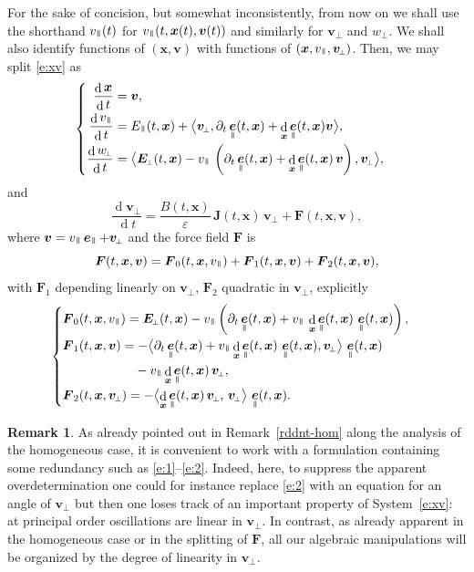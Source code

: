 \documentclass[10pt]{amsart}
\newenvironment{splitcases}
{\begin{cases}\begin{aligned}}
{\end{aligned}\end{cases}}
\newcommand{\sperp}{{\scriptscriptstyle\perp}}
\newcommand{\blangle}{\bigl\langle}
\newcommand{\brangle}{\bigr\rangle}
\let\eps\varepsilon
\let\d\partial
\DeclareMathOperator\dD{d}\let\dd\dD
\theoremstyle{plain}
\theoremstyle{definition}
\newtheorem{remark}[theorem]{Remark}
\newcommand\br{\begin{remark}}
\newcommand\er{\end{remark}}
\newcommand{\be}{\begin{equation}}
\newcommand{\ee}{\end{equation}}
\newcommand\bE{{\boldsymbol E}}
\newcommand\bF{{\boldsymbol F}}
\newcommand\bJ{{\boldsymbol J}}
\newcommand\bfv{{\boldsymbol v}}
\newcommand\bfx{{\boldsymbol x}}
\DeclareMathOperator{\beD}{\boldsymbol{e}}
\newcommand\eDpar{\beD_\mypar}
\newcommand\vpar{v_\mypar}
\newcommand\bvperp{\bfv_{\!\sperp}}
\newcommand\eperp{w_{\!\sperp}}
\newcommand\Epar{E_\mypar}
\newcommand\Eperp{\bE_{\!\sperp}}
\newcommand{\mypar}{{\mkern3mu\vphantom{\perp}\vrule depth 0pt\mkern2mu\vrule depth 0pt\mkern3mu}}
\begin{document}
For the sake of concision, but somewhat inconsistently, from now on we shall use the shorthand $\vpar(t)$ for $\vpar(t,\bfx(t),\bfv(t))$ and similarly for $\bvperp$ and $\eperp$. We shall also identify functions of $(\bfx,\bfv)$ with functions of $(\bfx,\vpar,\bvperp)$. Then, we may split \eqref{e:xv} as
\be
\label{e:1}
\begin{splitcases}
\frac{\dD\bfx}{\dD t} &=\bfv,
\\
\frac{\dD\vpar}{\dD t}&=\Epar(t,\bfx)+\blangle \bvperp ,
\d_t\eDpar(t,\bfx)+\dD_{\bfx}\eDpar(t,\bfx)\bfv \brangle,
\\
\frac{\dD\eperp}{\dD t}&= \blangle \Eperp(t,\bfx)-\vpar\,\left(\d_t\eDpar(t,\bfx)+\dD_{\bfx}\eDpar(t,\bfx)\,\bfv\right), \bvperp\brangle,
\end{splitcases}
\ee
and
\be
\label{e:2}
\frac{\dD\bvperp}{\dD t}=
\frac{B(t,\bfx)}{\eps}\, \bJ(t,\bfx)\,\bvperp
+ \bF(t,\bfx,\bfv),
\ee
where $\bfv=\vpar\eDpar+\bvperp$ and the force field $\bF$ is
\[
\bF(t,\bfx,\bfv)=\bF_0(t,\bfx,\vpar)+\bF_1(t,\bfx,\bfv)+\bF_2(t,\bfx,\bfv),
\]
with $\bF_1$ depending linearly on $\bvperp$, $\bF_2$ quadratic in $\bvperp$, explicitly
\be
\label{def:F}
\begin{splitcases}
&\bF_0(t,\bfx,\vpar) =  \Eperp(t,\bfx)-
\vpar\left(\d_t\eDpar(t,\bfx)+\vpar\,\dD_{\bfx}\eDpar(t,\bfx)\,\eDpar(t,\bfx)\right),
\\
&\bF_1(t,\bfx,\bfv) =  -
\blangle\d_t\eDpar(t,\bfx)+\vpar\dD_{\bfx}\eDpar(t,\bfx)\,\eDpar(t,\bfx),
\bvperp
\brangle\,\eDpar(t,\bfx)\\
&\hphantom{\bF_1(t,\bfx,\bfv)=}-\vpar\dD_{\bfx}\eDpar(t,\bfx)\,\bvperp,
\\
&\bF_2(t,\bfx,\bvperp) =  - \blangle
\dD_{\bfx}\eDpar(t,\bfx)\,\bvperp,\, \bvperp \brangle\,\eDpar(t,\bfx).
\end{splitcases}
\ee

\br
As already pointed out in Remark~\ref{rddnt-hom} along the analysis of the homogeneous case, it is convenient to work with a formulation containing some redundancy such as \eqref{e:1}--\eqref{e:2}. Indeed, here, to suppress the apparent overdetermination one could for instance replace \eqref{e:2} with an equation for an angle of $\bvperp$ but then one loses track of an important property of System~\eqref{e:xv}: at principal order oscillations are linear in $\bvperp$. In contrast, as already apparent in the homogeneous case or in the splitting of $\bF$, all our algebraic manipulations will be organized by the degree of linearity in $\bvperp$.
\er
\end{document}
